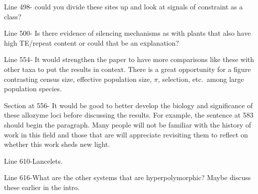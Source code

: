 
\begin{point}{} %
Line 498- could you divide these sites up and look at signals of
constraint as a class?
\end{point}


\begin{point}{} %
Line 500- Is there evidence of silencing mechanisms as with plants that
also have high TE/repeat content or could that be an explanation?
\end{point}


\begin{point}{} %
Line 554- It would strengthen the paper to have more comparisons like
these with other taxa to put the results in context. There is a great
opportunity for a figure contrasting census size, effective population
size, $\pi$, selection, etc.\ among large population species.
\end{point}


\begin{point}{} %
Section at 556- It would be good to better develop the biology and
significance of these allozyme loci before discussing the results. For
example, the sentence at 583 should begin the paragraph. Many people will
not be familiar with the history of work in this field and those that are
will appreciate revisiting them to reflect on whether this work sheds new
light.
\end{point}


\begin{point}{} %
Line 610-Lancelets.
\end{point}


\begin{point}{} %
Line 616-What are the other systems that are hyperpolymorphic? Maybe
discuss these earlier in the intro.
\end{point}

